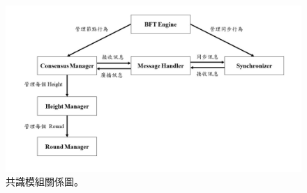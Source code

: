 \begin{figure}[htb]
\centering
\includegraphics[scale=0.45]{images/5.jpg}
\caption{共識模組關係圖。}
\label{i:byz-latency}
\end{figure}